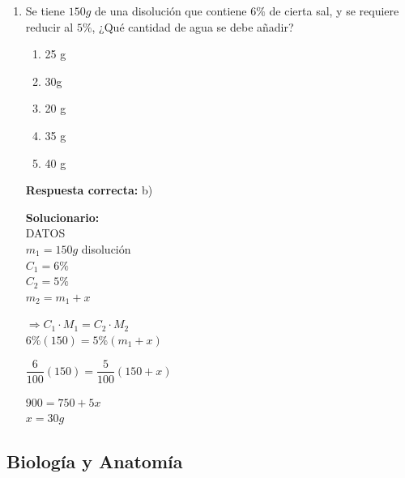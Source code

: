 \begin{enumerate}
	\textbf{Respuesta correcta:} a)
	
	\vspace{2mm}
	\textbf{Solucionario:}\\

	Los componentes de la lluvia ácida son los ácidos azufre y nitrógeno como $H_2SO_4$ (ácido sulfúrico) y $HNO_3$ (ácido nítrico).
	
	Los gases producidos como el $NO_x$ y $SO_x$ causan la lluvia ácida.
	
	\vspace{6mm}
	
	\item Se tiene $150g$ de una disolución que contiene $6\%$ de cierta sal, y se requiere reducir al $5\%$, ¿Qué cantidad de agua se debe añadir?
	
	\begin{enumerate}[label=\alph*)]
		\item 25 g
		\item 30g
		\item 20 g
		\item 35 g
		\item 40 g
	\end{enumerate}
	
	\textbf{Respuesta correcta:} b)
	
	\vspace{2mm}
	\textbf{Solucionario:}\\

	DATOS \\
	$m_1 = 150g$ disolución \\
	$C_1 = 6\%$ \\
	$C_2 = 5\%$ \\
	$m_2 = m_1 + x$
	
	\vspace{2mm}
	$\Rightarrow C_1 \cdot M_1 = C_2 \cdot M_2$ \\
	$6\% (150) = 5\% (m_1 + x)$ 
	
	$\dfrac{6}{100} (150) = \dfrac{5}{100} (150 + x)$ 
	
	$900 = 750 + 5x$ \\
	$x = 30g$
	
	\vspace{6mm}
	
\end{enumerate}








\subsection*{Biología y Anatomía}

